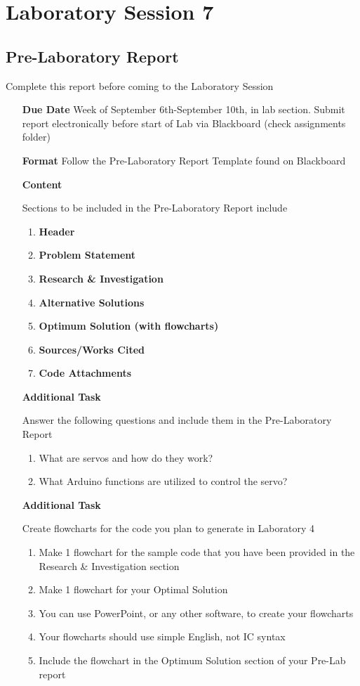 \documentclass[]{report}
\begin{document}
\chapter{Laboratory Session 7}
\section{Pre-Laboratory Report}
Complete this report before coming to the Laboratory Session
\begin{itemize}
	\item[\textbf{Due Date}]{Week of September 6th-September 10th, \the\year \space in lab section. Submit report electronically before start of Lab via Blackboard (check assignments folder)}
	\item[\textbf{Format}]{Follow the Pre-Laboratory Report Template found on Blackboard}
	\item[\textbf{Content}]{Sections to be included in the Pre-Laboratory Report include
		\begin{enumerate}
			\item \textbf{Header}
			\item \textbf{Problem Statement}
			\item \textbf{Research \& Investigation}
			\item \textbf{Alternative Solutions}
			\item \textbf{Optimum Solution (with flowcharts)}
			\item \textbf{Sources/Works Cited}
			\item \textbf{Code Attachments}
		\end{enumerate}
		
	}
	
	\item[\textbf{Additional Task}]{Answer the following questions and include them in the Pre-Laboratory Report
		\begin{enumerate}[label=\alph*.]
			\item What are servos and how do they work?
			\item What Arduino functions are utilized to control the servo?  
		\end{enumerate}	
	}
	
	\item[\textbf{Additional Task}]{Create flowcharts for the code you plan to generate in Laboratory 4
		\begin{enumerate}[label=\alph*.]
			\item Make 1 flowchart for the sample code that you have been provided in the Research \& Investigation section 
			\item Make 1 flowchart for your Optimal Solution
			\item You can use PowerPoint, or any other software, to create your flowcharts
			\item Your flowcharts should use simple English, not IC syntax
			\item Include the flowchart in the Optimum Solution section of your Pre-Lab report
		\end{enumerate}	
	}
\end{itemize}
\end{document}
